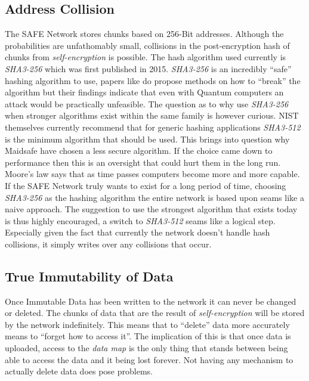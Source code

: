 \subsection{Address Collision}
\label{subsec:address-collision}

The SAFE Network stores chunks based on 256-Bit addresses. Although the probabilities are unfathomably small, collisions in the post-encryption hash of chunks from \textit{self-encryption} is possible. The hash algorithm used currently is \textit{SHA3-256}\cite{dworkin2015sha} which was first published in 2015. \textit{SHA3-256} is an incredibly ``safe'' hashing algorithm to use, papers like \cite{amy2016estimating} do propose methods on how to ``break'' the algorithm but their findings indicate that even with Quantum computers an attack would be practically unfeasible. The question as to why use \textit{SHA3-256} when stronger algorithms exist within the same family is however curious. NIST themselves currently recommend\cite{hash-reccomend} that for generic hashing applications \textit{SHA3-512} is the minimum algorithm that should be used. This brings into question why Maidsafe have chosen a less secure algorithm. If the choice came down to performance then this is an oversight that could hurt them in the long run. Moore's law\cite{schaller1997moore} says that as time passes computers become more and more capable. If the SAFE Network truly wants to exist for a long period of time, choosing \textit{SHA3-256} as the hashing algorithm the entire network is based upon seams like a naive approach. The suggestion to use the strongest algorithm that exists today is thus highly encouraged, a switch to \textit{SHA3-512} seams like a logical step. Especially given the fact that currently the network doesn't handle hash collisions, it simply writes over any collisions that occur.

\subsection{True Immutability of Data}
\label{subsec:immutability-of-data}

Once Immutable Data has been written to the network it can never be changed or deleted. The chunks of data that are the result of \textit{self-encryption} will be stored by the network indefinitely. This means that to ``delete'' data more accurately means to ``forget how to access it''. The implication of this is that once data is uploaded, access to the \textit{data map} is the only thing that stands between being able to access the data and it being lost forever. Not having any mechanism to actually delete data does pose problems.

